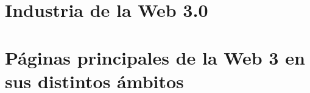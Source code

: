 \section{Industria de la Web 3.0}


\section{Páginas principales de la Web 3 en sus distintos ámbitos}
